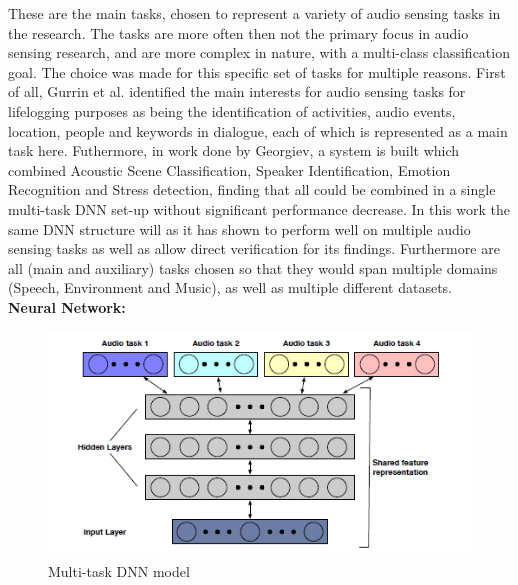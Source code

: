 	
	These are the main tasks, chosen to represent a variety of audio sensing tasks in the research. The tasks are more often then not the primary focus in audio sensing research, and are more complex in nature, with a multi-class classification goal. The choice was made for this specific set of tasks for multiple reasons. First of all, Gurrin et al. identified the main interests for audio sensing tasks for lifelogging purposes as being the identification of activities, audio events, location, people and keywords in dialogue, each of which is represented as a main task here. Futhermore, in work done by Georgiev, a system is built which combined Acoustic Scene Classification, Speaker Identification, Emotion Recognition and Stress detection, finding that all could be combined in a single multi-task DNN set-up without significant performance decrease. In this work the same DNN structure will as it has shown to perform well on multiple audio sensing tasks as well as allow direct verification for its findings. Furthermore are all (main and auxiliary) tasks chosen so that they would span multiple domains (Speech, Environment and Music), as well as multiple different datasets. \\

	
	\textbf{Neural Network:}\\
	
	\begin{figure}
		\centering
		\includegraphics[width=0.9\linewidth]{NN.PNG}
		\caption{Multi-task DNN model}
		\label{fig:NN}
	\end{figure}

	
